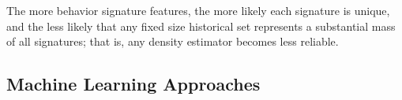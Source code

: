 


The more behavior signature features, the more likely each signature is unique, and the less likely that any fixed size historical set represents a substantial mass of all signatures; that is, any density estimator becomes less reliable.

%
%
\subsection{Machine Learning Approaches}

